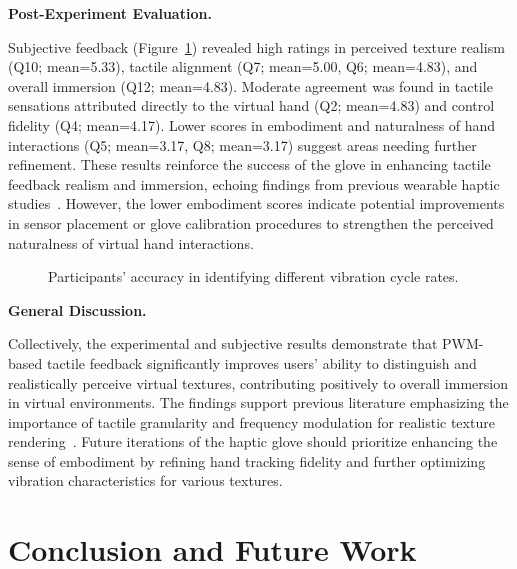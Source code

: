 \documentclass[graybox]{svmult}
\begin{document}
\textbf{Post-Experiment Evaluation.} 

Subjective feedback (Figure~\ref{fig:questionnaire_results}) revealed high ratings in perceived texture realism (Q10; mean=5.33), tactile alignment (Q7; mean=5.00, Q6; mean=4.83), and overall immersion (Q12; mean=4.83). Moderate agreement was found in tactile sensations attributed directly to the virtual hand (Q2; mean=4.83) and control fidelity (Q4; mean=4.17). Lower scores in embodiment and naturalness of hand interactions (Q5; mean=3.17, Q8; mean=3.17) suggest areas needing further refinement. These results reinforce the success of the glove in enhancing tactile feedback realism and immersion, echoing findings from previous wearable haptic studies~\cite{pacchierotti2017wearable}. However, the lower embodiment scores indicate potential improvements in sensor placement or glove calibration procedures to strengthen the perceived naturalness of virtual hand interactions.

\begin{figure}\centering
	
	\caption{Participants' accuracy in identifying different vibration cycle rates.}\label{fig:questionnaire_results}
\end{figure}

\textbf{General Discussion.}  

Collectively, the experimental and subjective results demonstrate that PWM-based tactile feedback significantly improves users' ability to distinguish and realistically perceive virtual textures, contributing positively to overall immersion in virtual environments. The findings support previous literature emphasizing the importance of tactile granularity and frequency modulation for realistic texture rendering~\cite{strohmeier2017generating,bach2023enhanced}. Future iterations of the haptic glove should prioritize enhancing the sense of embodiment by refining hand tracking fidelity and further optimizing vibration characteristics for various textures.


\section{Conclusion and Future Work}
\end{document}
